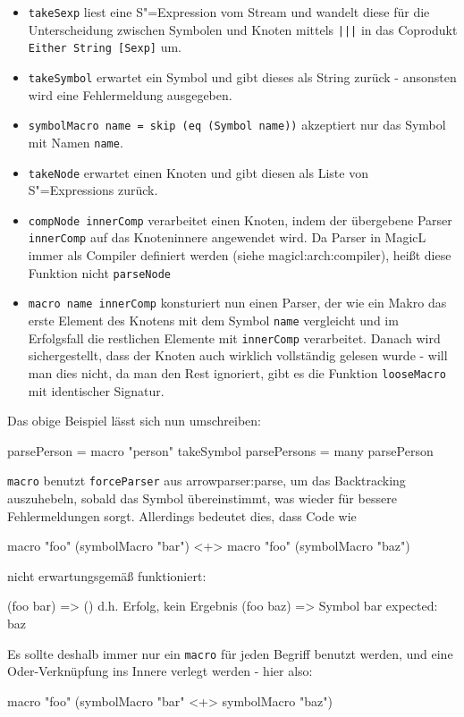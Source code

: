 \documentclass[11pt, a4paper, bibgerm]{scrbook}
\newcommand\icode[1]{\lstinline?#1?}
\newcommand\sref{}
\newcommand{\sexp}{S"=Expression}
\newcommand{\sexps}{S"=Expressions}
\begin{document}
\begin{itemize}
\item \icode{takeSexp} liest eine \sexp{} vom Stream und wandelt diese
  für die Unterscheidung zwischen Symbolen und Knoten mittels
  \icode{|||} in das Coprodukt \icode{Either String [Sexp]} um.
\item \icode{takeSymbol} erwartet ein Symbol und gibt dieses als String
  zurück - ansonsten wird eine Fehlermeldung ausgegeben.
\item \icode{symbolMacro name = skip (eq (Symbol name))} akzeptiert nur
  das Symbol mit Namen \icode{name}.
\item \icode{takeNode} erwartet einen Knoten und gibt diesen als Liste
  von \sexps{} zurück.
\item \icode{compNode innerComp} verarbeitet einen Knoten, indem der
  übergebene Parser \icode{innerComp} auf das Knoteninnere angewendet
  wird. Da Parser in MagicL immer als Compiler definiert werden (siehe
  \sref{magicl:arch:compiler}), heißt diese Funktion nicht \icode{parseNode}
\item \icode{macro name innerComp} %
  konsturiert nun einen Parser, der wie ein Makro das erste Element des
  Knotens mit dem Symbol \icode{name} vergleicht und im Erfolgsfall die
  restlichen Elemente mit \icode{innerComp} verarbeitet. Danach wird
  sichergestellt, dass der Knoten auch wirklich vollständig gelesen
  wurde - will man dies nicht, da man den Rest ignoriert, gibt es die
  Funktion \icode{looseMacro} mit identischer Signatur.
\end{itemize}
Das obige Beispiel lässt sich nun umschreiben:
\begin{code}
parsePerson  = macro "person" takeSymbol
parsePersons = many parsePerson
\end{code}

\icode{macro} benutzt \icode{forceParser} aus
\sref{arrowparser:parse}, um das Backtracking auszuhebeln, sobald das
Symbol übereinstimmt, was wieder für bessere Fehlermeldungen
sorgt. Allerdings bedeutet dies, dass Code wie
\begin{code}
macro "foo" (symbolMacro "bar") <+> macro "foo" (symbolMacro "baz")
\end{code}
nicht erwartungsgemäß funktioniert:
\begin{code}
(foo bar)   => ()  d.h. Erfolg, kein Ergebnis
(foo baz)   => Symbol bar expected: baz
\end{code}
Es sollte deshalb immer nur ein \icode{macro} für jeden Begriff benutzt
werden, und eine Oder-Verknüpfung ins Innere verlegt werden - hier also:
\begin{code}
macro "foo" (symbolMacro "bar" <+> symbolMacro "baz")
\end{code}
\end{document}
